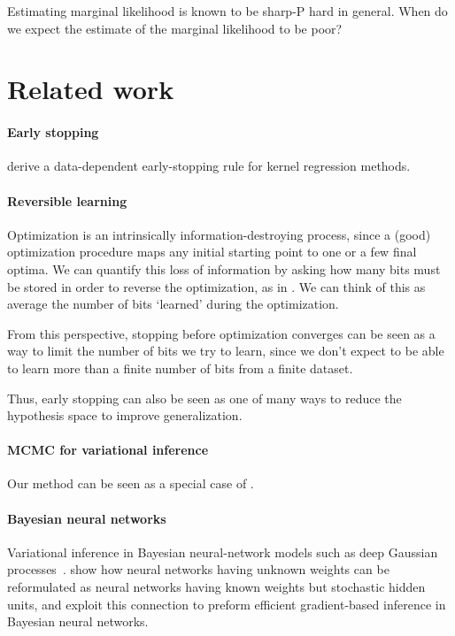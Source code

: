 \documentclass[]{article}
\begin{document}
Estimating marginal likelihood is known to be sharp-P hard in general.
When do we expect the estimate of the marginal likelihood to be poor?




\section{Related work}

\paragraph{Early stopping}

\citet{raskutti2014early} derive a data-dependent early-stopping rule for kernel regression methods.


\paragraph{Reversible learning} 
Optimization is an
intrinsically information-destroying process, since a (good) optimization
procedure maps any initial starting point to one or a few final optima. We can
quantify this loss of information by asking how many bits must be stored in order
to reverse the optimization, as in \citet{MacDuvAda2015hyper}.
 We can think of this as average the number of bits
`learned' during the optimization.

From this perspective, stopping before optimization
converges can be seen as a way to limit the number of bits we try to learn,
since we don't expect to be able to learn more than a finite number of bits from a finite dataset.

Thus, early stopping can also be seen as one of many ways to reduce the hypothesis space to improve generalization.

\paragraph{MCMC for variational inference}
Our method can be seen as a special case of \citet{Bridging14}.


\paragraph{Bayesian neural networks}
Variational inference in Bayesian neural-network models such as deep Gaussian processes~\citep{deepGPVar14}.
\citet{kingma2014efficient} show how neural networks having unknown weights can be reformulated as neural networks having known weights but stochastic hidden units, and exploit this connection to preform efficient gradient-based inference in Bayesian neural networks.
\end{document}
